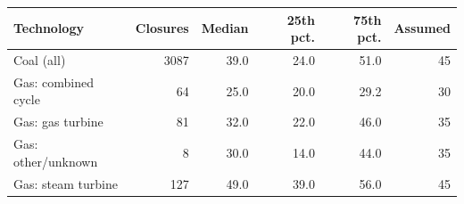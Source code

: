 \begin{tabular}{lrrrrr}
\toprule
Technology & Closures & Median & 25th pct. & 75th pct. & Assumed \\
\midrule
Coal (all) & 3087 & 39.0 & 24.0 & 51.0 & 45 \\
Gas: combined cycle & 64 & 25.0 & 20.0 & 29.2 & 30 \\
Gas: gas turbine & 81 & 32.0 & 22.0 & 46.0 & 35 \\
Gas: other/unknown & 8 & 30.0 & 14.0 & 44.0 & 35 \\
Gas: steam turbine & 127 & 49.0 & 39.0 & 56.0 & 45 \\
\bottomrule
\end{tabular}

